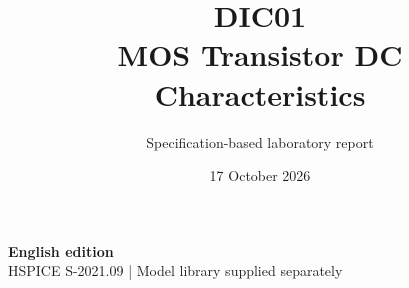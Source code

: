 \documentclass[11pt,a4paper]{article}
\title{\color{accent}DIC01\\[4pt]MOS Transistor DC Characteristics}
\author{Specification-based laboratory report}
\date{17 October 2026}
\begin{document}
\maketitle
\begin{center}\small\textbf{English edition}\\
HSPICE S-2021.09 \quad | \quad Model library supplied separately
\end{center}


\end{document}
